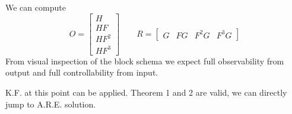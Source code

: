 \begin{exercise}

    We can compute
    \[
        O = \begin{bmatrix}
            H \\
            HF \\
            HF^2 \\
            HF^3
        \end{bmatrix}
        \qquad
        R = \begin{bmatrix}
            G & FG & F^2G & F^3G
        \end{bmatrix}
    \]
    From visual inspection of the block schema we expect full observability from output and full controllability from input.

    K.F. at this point can be applied.
    Theorem 1 and 2 are valid, we can directly jump to A.R.E. solution.
\end{exercise}
